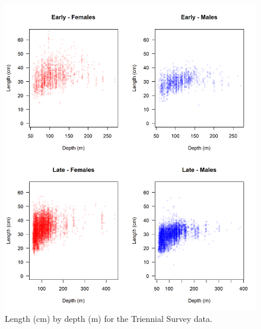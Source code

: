 \documentclass[12pt,]{article}
\begin{document}
\begin{figure}
\centering
\includegraphics{Figures/Tri_Size_by_Depth.png}
\caption{Length (cm) by depth (m) for the Triennial Survey data.
\label{fig:tri_size_depth}}
\end{figure}

\FloatBarrier
\end{document}
